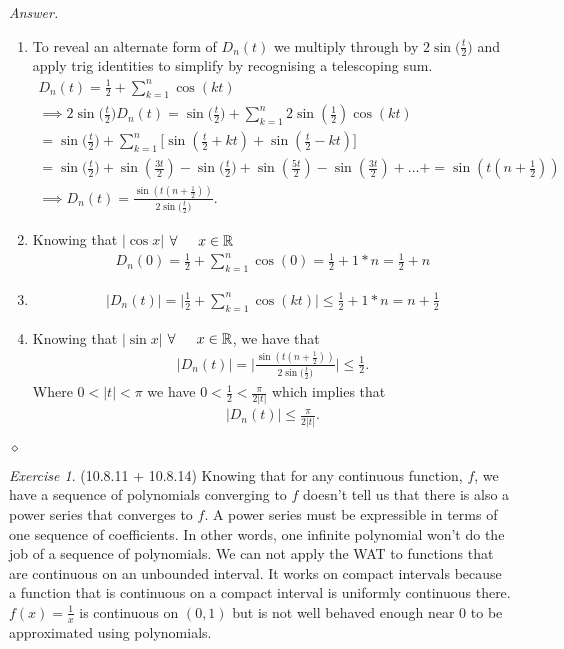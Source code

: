 \documentclass[12pt,oneside]{amsart}
\theoremstyle{definition}
\theoremstyle{remark}
\newtheorem{exer}{Exercise}
\numberwithin{equation}{exer}
\newenvironment{answer}{\bigskip\noindent\emph{Answer.}}{\hfill$\diamond$\newline}
\newcommand{\smm}{\sum_{k=1}^n}
\newcommand{\snn}{\sin{\big(\frac{t}{2}\big)}}
\begin{document}
\begin{answer}
\begin{enumerate}[label=(\alph*)]
\item To reveal an alternate form of $D_n(t)$ we multiply through by $2\snn$ and apply trig identities to simplify by recognising a telescoping sum.
\begin{align*}
    D_n(t) = \frac{1}{2} + \smm \cos{(kt)}\\
    \implies 2\sin{\big(\frac{t}{2}\big)} D_n(t)
    = \sin{\big(\frac{t}{2}\big)} + \smm2\sin{(\frac{1}{2})}\cos{(kt)}\\
    = \sin{\big(\frac{t}{2}\big)} + \smm\bigg[ \sin{(\frac{t}{2} + kt)} + \sin{(\frac{t}{2} - kt)}\bigg]\\
    = \snn + \sin{(\frac{3t}{2})} - \snn +\sin{(\frac{5t}{2})} - \sin{(\frac{3t}{2})} +\dots+
    =\sin{(t(n+\frac{1}{2}))}\\
    \implies D_n(t) = \frac{\sin{(t(n+\frac{1}{2}))}}{2\snn}.
\end{align*}
\item Knowing that $|\cos{x}|$  \indent $\forall \indent x \in \mathbb{R}$
\begin{align*}
    D_n(0) = \frac{1}{2} + \smm \cos{(0)} = \frac{1}{2} + 1 * n =\frac{1}{2} +n 
\end{align*}
\item
\begin{align*}
|D_n(t)| =\big| \frac{1}{2} + \smm \cos{(kt)} \big| \leq \frac{1}{2} + 1*n = n +\frac{1}{2}
\end{align*}
\item Knowing that $|\sin{x}|$  \indent $\forall \indent x \in \mathbb{R}$, we have that
\begin{align*}
    |D_n(t)| = \Bigg| \frac{\sin{(t(n+\frac{1}{2}))}}{2\snn} \Bigg| \leq \frac{1}{2}.
\end{align*}
Where $0 < |t| < \pi$ we have $0<\frac{1}{2} < \frac{\pi}{2|t|}$ which implies that
\begin{align*}
    |D_n(t)| \leq \frac{\pi}{2|t|}.
\end{align*}

\end{enumerate}

\end{answer}




\newpage
\begin{exer}(10.8.11 + 10.8.14)
\indent Knowing that for any continuous function, $f$, we have a sequence of polynomials converging to $f$ doesn't tell us that there is also a power series that converges to $f$. A power series must be expressible in terms of one sequence of coefficients. In other words, one infinite polynomial won't do the job of a sequence of polynomials. 
\newline \indent 
We can not apply the WAT to functions that are continuous on an unbounded interval. It works on compact intervals because a function that is continuous on a compact interval is uniformly continuous there. $f(x) = \frac{1}{x}$ is continuous on $(0,1)$ but is not well behaved enough near $0$ to be approximated using polynomials. 
\end{exer}
\end{document}
